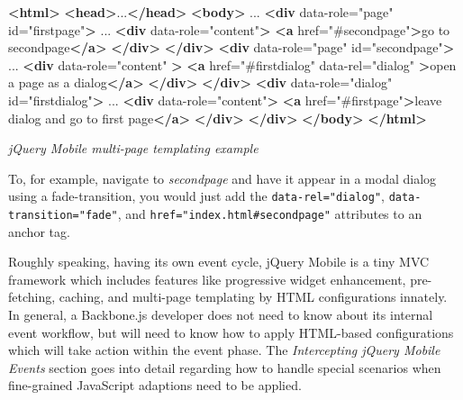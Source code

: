 \documentclass[9pt]{book}
\newenvironment{Shaded}{}{}
\newcommand{\KeywordTok}[1]{\textcolor[rgb]{0.00,0.44,0.13}{\textbf{{#1}}}}
\newcommand{\StringTok}[1]{\textcolor[rgb]{0.25,0.44,0.63}{{#1}}}
\newcommand{\OtherTok}[1]{\textcolor[rgb]{0.00,0.44,0.13}{{#1}}}
\newcommand{\NormalTok}[1]{{#1}}
\begin{document}
\begin{Shaded}
\begin{Highlighting}[]
\KeywordTok{<html>}
  \KeywordTok{<head>}\NormalTok{...}\KeywordTok{</head>}
  \KeywordTok{<body>}
  \NormalTok{...}
  \KeywordTok{<div}\OtherTok{ data-role=}\StringTok{"page"}\OtherTok{ id=}\StringTok{"firstpage"}\KeywordTok{>}
    \NormalTok{...}
   \KeywordTok{<div}\OtherTok{ data-role=}\StringTok{"content"}\KeywordTok{>} 
     \KeywordTok{<a}\OtherTok{ href=}\StringTok{"#secondpage"}\KeywordTok{>}\NormalTok{go to secondpage}\KeywordTok{</a>}
   \KeywordTok{</div>}
  \KeywordTok{</div>}
  \KeywordTok{<div}\OtherTok{ data-role=}\StringTok{"page"}\OtherTok{ id=}\StringTok{"secondpage"}\KeywordTok{>}
    \NormalTok{...}
    \KeywordTok{<div}\OtherTok{ data-role=}\StringTok{"content"} \KeywordTok{>}
       \KeywordTok{<a}\OtherTok{ href=}\StringTok{"#firstdialog"}\OtherTok{ data-rel=}\StringTok{"dialog"} \KeywordTok{>}\NormalTok{open a page as a dialog}\KeywordTok{</a>}
    \KeywordTok{</div>}
  \KeywordTok{</div>}
  \KeywordTok{<div}\OtherTok{ data-role=}\StringTok{"dialog"}\OtherTok{ id=}\StringTok{"firstdialog"}\KeywordTok{>}
    \NormalTok{...}
     \KeywordTok{<div}\OtherTok{ data-role=}\StringTok{"content"}\KeywordTok{>}
       \KeywordTok{<a}\OtherTok{ href=}\StringTok{"#firstpage"}\KeywordTok{>}\NormalTok{leave dialog and go to first page}\KeywordTok{</a>}
     \KeywordTok{</div>}
  \KeywordTok{</div>}
\KeywordTok{</body>}
\KeywordTok{</html>}
\end{Highlighting}
\end{Shaded}

\emph{jQuery Mobile multi-page templating example}

To, for example, navigate to \emph{secondpage} and have it appear in a
modal dialog using a fade-transition, you would just add the
\texttt{data-rel="dialog"}, \texttt{data-transition="fade"}, and
\texttt{href="index.html\#secondpage"} attributes to an anchor tag.

Roughly speaking, having its own event cycle, jQuery Mobile is a tiny
MVC framework which includes features like progressive widget
enhancement, pre-fetching, caching, and multi-page templating by HTML
configurations innately. In general, a Backbone.js developer does not
need to know about its internal event workflow, but will need to know
how to apply HTML-based configurations which will take action within the
event phase. The \emph{Intercepting jQuery Mobile Events} section goes
into detail regarding how to handle special scenarios when fine-grained
JavaScript adaptions need to be applied.
\end{document}
